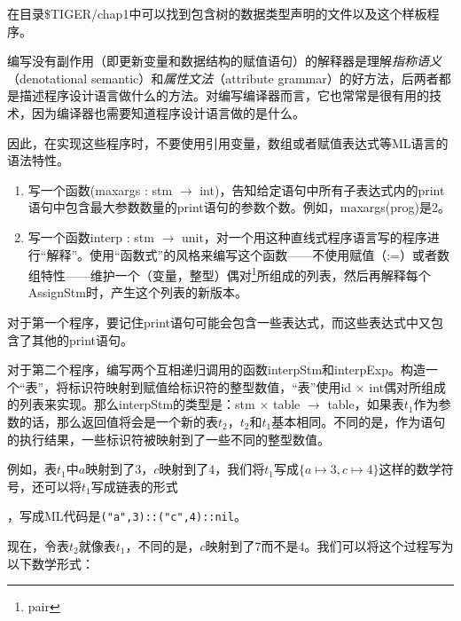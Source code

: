 \documentclass[cn,11pt,chinese]{elegantbook}
\begin{document}
在目录\$TIGER/chap1中可以找到包含树的数据类型声明的文件以及这个样板程序。

编写没有副作用（即更新变量和数据结构的赋值语句）的解释器是理解\textit{指称语义}（denotational semantic）和\textit{属性文法}（attribute grammar）的好方法，后两者都是描述程序设计语言做什么的方法。对编写编译器而言，它也常常是很有用的技术，因为编译器也需要知道程序设计语言做的是什么。

因此，在实现这些程序时，不要使用引用变量，数组或者赋值表达式等ML语言的语法特性。

\begin{enumerate}
  \item 写一个函数(maxargs : stm $\rightarrow$ int)，告知给定语句中所有子表达式内的print语句中包含最大参数数量的print语句的参数个数。例如，maxargs(prog)是2。
  \item 写一个函数interp : stm $\rightarrow$ unit，对一个用这种直线式程序语言写的程序进行“解释”。使用“函数式”的风格来编写这个函数——不使用赋值（:=）或者数组特性——维护一个（变量，整型）偶对\footnote{pair}所组成的列表，然后再解释每个AssignStm时，产生这个列表的新版本。
\end{enumerate}

对于第一个程序，要记住print语句可能会包含一些表达式，而这些表达式中又包含了其他的print语句。

对于第二个程序，编写两个互相递归调用的函数interpStm和interpExp。构造一个“表”，将标识符映射到赋值给标识符的整型数值，“表”使用id $\times$ int偶对所组成的列表来实现。那么interpStm的类型是：stm $\times$ table $\rightarrow$ table，如果表$t_1$作为参数的话，那么返回值将会是一个新的表$t_2$，$t_2$和$t_1$基本相同。不同的是，作为语句的执行结果，一些标识符被映射到了一些不同的整型数值。

例如，表$t_1$中$a$映射到了$3$，$c$映射到了$4$，我们将$t_1$写成$\{a \mapsto 3,c \mapsto 4\}$这样的数学符号，还可以将$t_1$写成链表的形式
，写成ML代码是\texttt{("a",3)::("c",4)::nil}。

现在，令表$t_2$就像表$t_1$，不同的是，$c$映射到了$7$而不是$4$。我们可以将这个过程写为以下数学形式：
\end{document}
